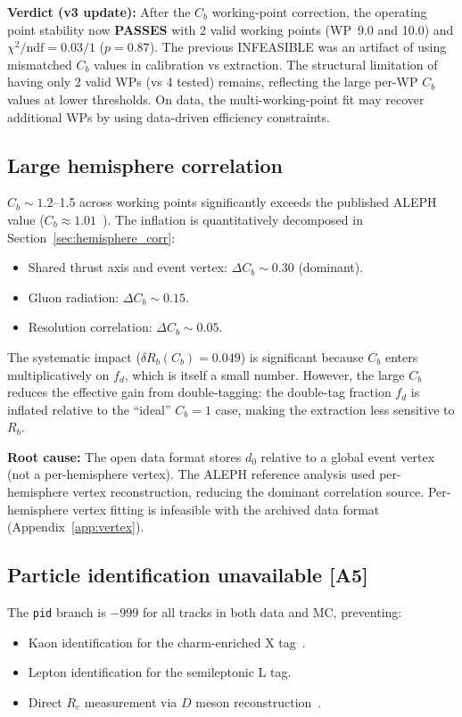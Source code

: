 \documentclass[11pt,a4paper]{article}
\begin{document}
\textbf{Verdict (v3 update):} After the $C_b$ working-point correction, the operating
point stability now \textbf{PASSES} with 2 valid working points (WP~9.0 and 10.0) and
$\chi^2/\mathrm{ndf} = 0.03/1$ ($p = 0.87$). The previous INFEASIBLE was an artifact of using
mismatched $C_b$ values in calibration vs extraction. The structural limitation of
having only 2 valid WPs (vs 4 tested) remains, reflecting the large per-WP $C_b$ values
at lower thresholds. On data, the multi-working-point fit may recover additional WPs
by using data-driven efficiency constraints.

\subsection{Large hemisphere correlation}

$C_b \sim 1.2$--1.5 across working points significantly exceeds the published ALEPH
value ($C_b \approx 1.01$~\cite{ALEPH:Rb:1996}). The inflation is quantitatively
decomposed in Section~\ref{sec:hemisphere_corr}:
\begin{itemize}
\item Shared thrust axis and event vertex: $\Delta C_b \sim 0.30$ (dominant).
\item Gluon radiation: $\Delta C_b \sim 0.15$.
\item Resolution correlation: $\Delta C_b \sim 0.05$.
\end{itemize}

The systematic impact ($\delta R_b(C_b) = 0.049$) is significant because $C_b$ enters
multiplicatively on $f_d$, which is itself a small number. However, the large $C_b$
reduces the effective gain from double-tagging: the double-tag fraction $f_d$ is
inflated relative to the ``ideal'' $C_b = 1$ case, making the extraction less sensitive
to $R_b$.

\textbf{Root cause:} The open data format stores $d_0$ relative to a global event
vertex (not a per-hemisphere vertex). The ALEPH reference analysis used per-hemisphere
vertex reconstruction, reducing the dominant correlation source. Per-hemisphere vertex
fitting is infeasible with the archived data format (Appendix~\ref{app:vertex}).

\subsection{Particle identification unavailable [A5]}

The \texttt{pid} branch is $-999$ for all tracks in both data and MC, preventing:
\begin{itemize}
\item Kaon identification for the charm-enriched X tag~\cite{ALEPH:Rb:1996}.
\item Lepton identification for the semileptonic L tag.
\item Direct $R_c$ measurement via $D$ meson reconstruction~\cite{ALEPH:Rc}.
\end{itemize}
\end{document}
